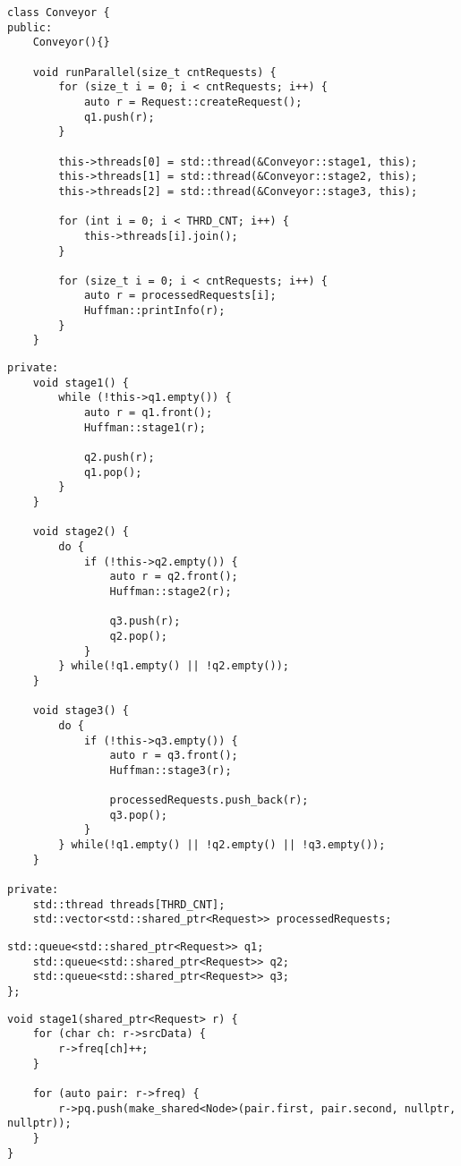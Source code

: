 \begin{lstlisting}[label=lst:Conveyor1,caption=Класс Conveyor (часть 1)]
class Conveyor {
public:
	Conveyor(){}
	
	void runParallel(size_t cntRequests) {
		for (size_t i = 0; i < cntRequests; i++) {
			auto r = Request::createRequest();
			q1.push(r);
		}
		
		this->threads[0] = std::thread(&Conveyor::stage1, this);
		this->threads[1] = std::thread(&Conveyor::stage2, this);
		this->threads[2] = std::thread(&Conveyor::stage3, this);
		
		for (int i = 0; i < THRD_CNT; i++) {
			this->threads[i].join();
		}
		
		for (size_t i = 0; i < cntRequests; i++) {
			auto r = processedRequests[i];
			Huffman::printInfo(r);
		}
	}
\end{lstlisting}

\begin{lstlisting}[label=lst:Conveyor2,caption=Класс Conveyor (часть 2)]
private:
	void stage1() {
		while (!this->q1.empty()) {
			auto r = q1.front();
			Huffman::stage1(r);
			
			q2.push(r);
			q1.pop();
		}	
	}
	
	void stage2() {
		do {
			if (!this->q2.empty()) {
				auto r = q2.front();
				Huffman::stage2(r);
				
				q3.push(r);
				q2.pop();
			}
		} while(!q1.empty() || !q2.empty());
	}
	
	void stage3() {
		do {
			if (!this->q3.empty()) {
				auto r = q3.front();
				Huffman::stage3(r);
				
				processedRequests.push_back(r);
				q3.pop();
			}
		} while(!q1.empty() || !q2.empty() || !q3.empty());
	}
	
private:
	std::thread threads[THRD_CNT];
	std::vector<std::shared_ptr<Request>> processedRequests;

\end{lstlisting}
\clearpage
\begin{lstlisting}[label=lst:Conveyor3,caption=Класс Conveyor (часть 3)]
	std::queue<std::shared_ptr<Request>> q1;
	std::queue<std::shared_ptr<Request>> q2;
	std::queue<std::shared_ptr<Request>> q3;
};
\end{lstlisting}

\begin{lstlisting}[label=lst:stage1,caption=1-й этап алгоритма Хаффмана]
void stage1(shared_ptr<Request> r) {
	for (char ch: r->srcData) {
		r->freq[ch]++;
	}
	
	for (auto pair: r->freq) {
		r->pq.push(make_shared<Node>(pair.first, pair.second, nullptr, nullptr));
	}
}
\end{lstlisting}

